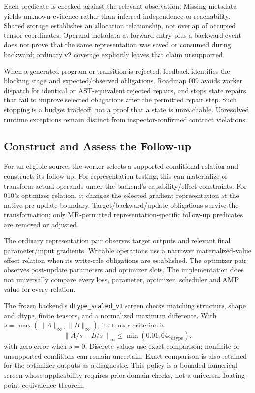 \documentclass[conference]{IEEEtran}
\begin{document}
Each predicate is checked against the relevant observation. Missing metadata yields unknown evidence rather than inferred independence or reachability. Shared storage establishes an allocation relationship, not overlap of occupied tensor coordinates. Operand metadata at forward entry plus a backward event does not prove that the same representation was saved or consumed during backward; ordinary v2 coverage explicitly leaves that claim unsupported.

When a generated program or transition is rejected, feedback identifies the blocking stage and expected/observed obligations. Roadmap 009 avoids worker dispatch for identical or AST-equivalent rejected repairs, and stops state repairs that fail to improve selected obligations after the permitted repair step. Such stopping is a budget tradeoff, not a proof that a state is unreachable. Unresolved runtime exceptions remain distinct from inspector-confirmed contract violations.

\subsection{Construct and Assess the Follow-up}
For an eligible source, the worker selects a supported conditional relation and constructs its follow-up. For representation testing, this can materialize or transform actual operands under the backend's capability/effect constraints. For 010's optimizer relation, it changes the selected gradient representation at the native pre-update boundary. Target/backward/update obligations survive the transformation; only MR-permitted representation-specific follow-up predicates are removed or adjusted.

The ordinary representation pair observes target outputs and relevant final parameter/input gradients. Writable operations use a narrower materialized-value effect relation when its write-role obligations are established. The optimizer pair observes post-update parameters and optimizer slots. The implementation does not universally compare every loss, parameter, optimizer, scheduler and AMP value for every relation.

The frozen backend's \texttt{dtype\_scaled\_v1} screen checks matching structure, shape and dtype, finite tensors, and a normalized maximum difference. With $s=\max(\|A\|_\infty,\|B\|_\infty)$, its tensor criterion is
\begin{equation}
 \left\|A/s-B/s\right\|_\infty
 \leq \min(0.01,64\epsilon_{\mathrm{dtype}}),
\end{equation}
with zero error when $s=0$. Discrete values use exact comparison; nonfinite or unsupported conditions can remain uncertain. Exact comparison is also retained for the optimizer outputs as a diagnostic. This policy is a bounded numerical screen whose applicability requires prior domain checks, not a universal floating-point equivalence theorem.
\end{document}
